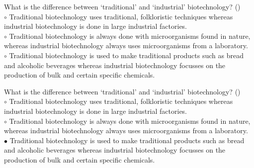\documentclass[]{beamer}
\begin{document}
\begin{CJK}{UTF8}{gbsn}
\begin{frame}[shrink] {}
\addtocounter{questions}{1}
\color{blue}
What is the difference between ‘traditional’ and ‘industrial’ biotechnology?
({})\\
\color{black}
\setlength{\parindent}{-0.4cm}
{\color{red}$\circ$} Traditional biotechnology uses traditional, folkloristic techniques whereas industrial biotechnology is done in large industrial factories.  \\
{\color{red}$\circ$} Traditional biotechnology is always done with microorganisms found in nature, whereas industrial biotechnology always uses microorganisms from a laboratory.  \\
{\color{red}$\circ$}  Traditional biotechnology  is used to make traditional products such as bread and alcoholic beverages whereas industrial biotechnology focusses on the production of bulk and certain specific chemicals.  \\
\end{frame}
\begin{frame}[shrink] {}
\addtocounter{answers}{1}
\color{blue}
What is the difference between ‘traditional’ and ‘industrial’ biotechnology?
({})\\
\color{black}
\setlength{\parindent}{-0.4cm}
{\color{red}$\circ$} Traditional biotechnology uses traditional, folkloristic techniques whereas industrial biotechnology is done in large industrial factories.  \\
{\color{red}$\circ$} Traditional biotechnology is always done with microorganisms found in nature, whereas industrial biotechnology always uses microorganisms from a laboratory.  \\
{\color{red}$\bullet$} Traditional biotechnology  is used to make traditional products such as bread and alcoholic beverages whereas industrial biotechnology focusses on the production of bulk and certain specific chemicals.  \\
\end{frame}



\end{CJK}
\end{document}
